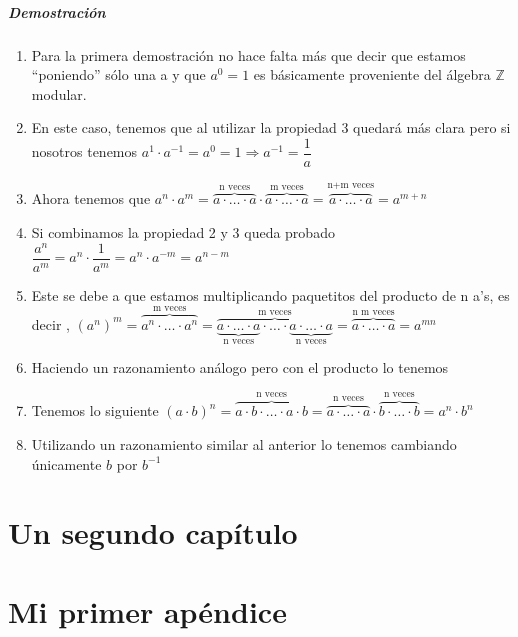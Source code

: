 \paragraph{Demostración}
\begin{enumerate}
\item Para la primera demostración no hace falta más que decir que estamos ``poniendo'' sólo una a y que $a^0=1$ es básicamente proveniente del álgebra $\mathbb{Z}$ modular.
 
\item En este caso,  tenemos que al utilizar la propiedad 3 quedará más clara pero si nosotros tenemos $a^1 \cdot a^{-1}=a^0=1 \Rightarrow a^{-1}=\dfrac{1}{a}$

\item Ahora tenemos que $a^n\cdot a^m=\overbrace{a \cdot\ldots \cdot a}^{\text{n veces}}\cdot \overbrace{a \cdot\ldots \cdot a}^{\text{m veces}}=\overbrace{a \cdot\ldots \cdot a}^{\text{n+m veces}}=a^{m+n}$
\item Si combinamos la propiedad 2 y 3 queda probado $\dfrac{a^n}{a^m}=a^n\cdot \dfrac{1}{a^m}=a^n \cdot a^{-m}=a^{n-m}$
\item Este se debe a que estamos multiplicando paquetitos del producto de n a's, es decir ,
$ \left( a^n \right) ^m =\overbrace{a^n \cdot \ldots \cdot a^n}^{\text{m veces}}=\overbrace{\underbrace{a \cdot \ldots \cdot a}_{\text{n veces}}\cdot \ldots \cdot \underbrace{a \cdot\ldots \cdot a}_{\text{n veces}}}^{\text{m veces}}=\overbrace{a \cdot\ldots \cdot a}^{\text{n m veces}}=a^{m n}$
\item Haciendo un razonamiento análogo pero con el producto lo tenemos 
\item Tenemos lo siguiente $(a \cdot b)^n=\overbrace{a\cdot b \cdot\ldots \cdot a\cdot b}^{\text{n veces}}=\overbrace{a \cdot\ldots \cdot a}^{\text{n veces}}\cdot \overbrace{b \cdot\ldots \cdot b}^{\text{n veces}}=a^n \cdot b^n$
\item Utilizando un razonamiento similar al anterior lo tenemos cambiando únicamente $b$ por $b^{-1}$
\end{enumerate}
\chapter{Un segundo cap\'itulo}
%
\minitoc%

\section{}
\section{}


\appendix
\chapter{Mi primer ap\'endice}